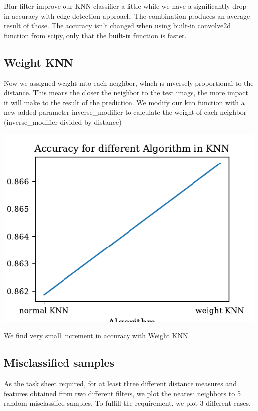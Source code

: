 \documentclass[11pt]{article}
\begin{document}
Blur filter improve our KNN-classifier a little while we have a significantly drop in accuracy with edge detection approach. The combination produces an average result of those. The accuracy isn't changed when using built-in convolve2d function from scipy, only that the built-in function is faster.


\subsection{Weight KNN}

Now we assigned weight into each neighbor, which is inversely proportional to the distance. This means the closer the neighbor to the test image, the more impact it will make to the result of the prediction. We modify our knn function with a new added parameter inverse\_modifier to calculate the weight of each neighbor (inverse\_modifier divided by distance)

\includegraphics{figures/1h_knn_acc_algo.pdf}

We find very small increment in accuracy with Weight KNN.

\subsection{Misclassified samples}

As the task sheet required, for at least three different distance measures and features obtained from two different filters, we plot the nearest neighbors to 5 random misclassifed samples. To fulfill the requirement, we plot 3 different cases.
\end{document}

